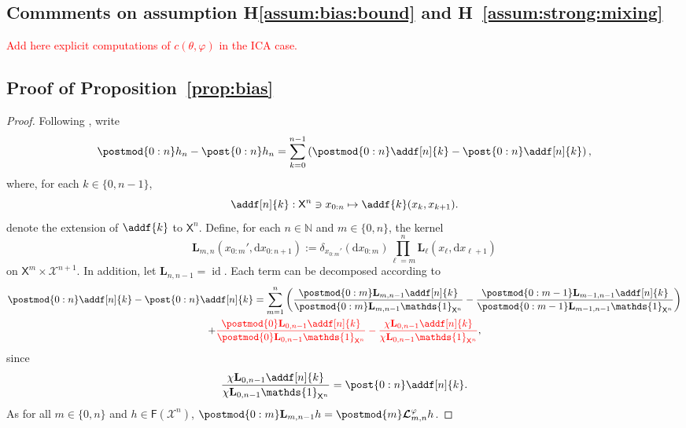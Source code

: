 \documentclass{article}
\newcommand{\Xfd}{\mathcal{X}}
\newcommand{\precpar}{\varphi}
\newcommand{\intvect}[2]{\{ #1, #2 \}}
\newcommand{\nset}{\mathbb{N}}
\newcommand{\1}{\mathbbm{1}}
\newcommand{\retrokmod}{\boldsymbol{\mathcal{L}}^\precpar}
\newcommand{\uk}[1]{\mathbf{L}_{#1}}
\newcommand{\Xset}{\mathsf{X}}
\newcommand{\bmf}[1]{\set{F}(#1)}
\newcommand{\set}[1]{\mathsf{#1}}
\def\1{\mathds{1}}
\newcommand{\rmd}{\ensuremath{\mathrm{d}}}
\newcommand{\eqdef}{\ensuremath{:=}}
\begin{document}
\subsection{Commments on assumption H\ref{assum:bias:bound} and H~\ref{assum:strong:mixing}}
\label{sec:assumptions}
\textcolor{red}{Add here explicit computations of $c(\theta,\varphi)$ in the ICA case.}

\subsection{Proof of Proposition~\ref{prop:bias}}
\label{sec:proof}

\begin{proof}
Following \cite{gloaguen2019pseudo} , write 
$$
\postmod{0:n} h_n - \post{0:n} h_n = \sum_{k = 0}^{n - 1} \left( \postmod{0:n} \addf[n]{k} - \post{0:n} \addf[n]{k} \right), 
$$
where, for each $k \in \intvect{0}{n - 1}$, 
\begin{equation} \label{eq:def:addf}
\addf[n]{k} : \Xset^n \ni x_{0:n} \mapsto \addf{k}(x_k, x_{k + 1}) .
\end{equation}
denote the extension of $\addf{k}$ to $\Xset^n$.  Define, for each $n \in \nset$ and $m \in \intvect{0}{n}$, the kernel 
\begin{equation} \label{eq:def:uk:products}
    \uk{m, n}(x_{0:m}', \rmd x_{0:n + 1}) \eqdef \delta_{x_{0:m}'}(\rmd x_{0:m}) \prod_{\ell = m}^n \uk{\ell}(x_\ell, \rmd x_{\ell + 1}) 
\end{equation}
on $\Xset^m \times \Xfd^{n + 1}$. In addition, let $\uk{n, n - 1} = \operatorname{id}$. 
Each term can be decomposed according to   
\begin{multline*}
\postmod{0:n} \addf[n]{k} - \post{0:n} \addf[n]{k} = 
\sum_{m = 1}^n \left( \frac{\postmod{0:m} \uk{m, n - 1} \addf[n]{k}}{\postmod{0:m} \uk{m, n - 1} \1_{\Xset^n}} - \frac{\postmod{0:m - 1} \uk{m - 1, n - 1} \addf[n]{k}}{\postmod{0:m - 1} \uk{m - 1, n - 1} \1_{\Xset^n}} \right) \\ + \textcolor{red}{\frac{\postmod{0} \uk{0, n - 1} \addf[n]{k}}{\postmod{0} \uk{0, n - 1} \1_{\Xset^n}} - \frac{\chi \uk{0, n - 1} \addf[n]{k}}{\chi\uk{0, n - 1} \1_{\Xset^n}}},
\end{multline*}
since 
$$
\frac{\chi \uk{0, n - 1} \addf[n]{k}}{\chi\uk{0, n - 1} \1_{\Xset^n}} = \post{0:n} \addf[n]{k}.
$$
As for all $m \in \intvect{0}{n}$ and $h \in \bmf{\Xfd^n}$, 
 $\postmod{0:m} \uk{m, n - 1} h = \postmod{m} \retrokmod_{m, n} h$.   

\end{proof}
\end{document}

